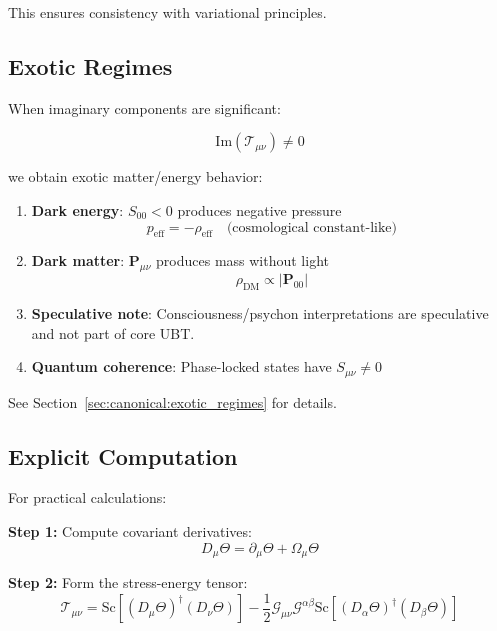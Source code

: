 This ensures consistency with variational principles.

\subsection{Exotic Regimes}

When imaginary components are significant:

\begin{equation}
\text{Im}(\mathcal{T}_{\mu\nu}) \neq 0
\end{equation}

we obtain exotic matter/energy behavior:

\begin{enumerate}
    \item \textbf{Dark energy}: $S_{00} < 0$ produces negative pressure
    \begin{equation}
    p_{\text{eff}} = -\rho_{\text{eff}} \quad \text{(cosmological constant-like)}
    \end{equation}
    
    \item \textbf{Dark matter}: $\mathbf{P}_{\mu\nu}$ produces mass without light
    \begin{equation}
    \rho_{\text{DM}} \propto |\mathbf{P}_{00}|
    \end{equation}
    
    \item \textbf{Speculative note}: Consciousness/psychon interpretations are speculative and not part of core UBT.
    
    \item \textbf{Quantum coherence}: Phase-locked states have $S_{\mu\nu} \neq 0$
\end{enumerate}

See Section~\ref{sec:canonical:exotic_regimes} for details.

\subsection{Explicit Computation}

For practical calculations:

\textbf{Step 1:} Compute covariant derivatives:
\begin{equation}
D_\mu \Theta = \partial_\mu \Theta + \Omega_\mu \Theta
\end{equation}

\textbf{Step 2:} Form the stress-energy tensor:
\begin{equation}
\mathcal{T}_{\mu\nu} = \text{Sc}[(D_\mu \Theta)^\dagger (D_\nu \Theta)] - \frac{1}{2} \mathcal{G}_{\mu\nu} \mathcal{G}^{\alpha\beta} \text{Sc}[(D_\alpha \Theta)^\dagger (D_\beta \Theta)]
\end{equation}

